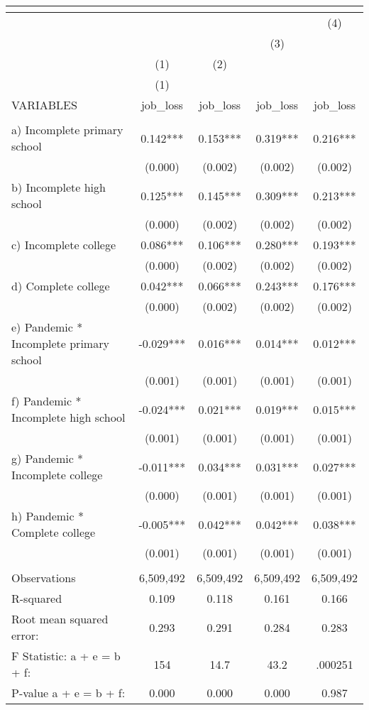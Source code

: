 \begin{tabular}{lcccc}
\multicolumn{5}{c}{} \\ \hline
 &  &  &  & (4) \\
 &  &  & (3) &  \\
 & (1) & (2) &  &  \\
 & (1) &  &  &  \\
VARIABLES & job\_loss & job\_loss & job\_loss & job\_loss \\ \hline
 &  &  &  &  \\
a) Incomplete primary school & 0.142*** & 0.153*** & 0.319*** & 0.216*** \\
 & (0.000) & (0.002) & (0.002) & (0.002) \\
b) Incomplete high school & 0.125*** & 0.145*** & 0.309*** & 0.213*** \\
 & (0.000) & (0.002) & (0.002) & (0.002) \\
c) Incomplete college & 0.086*** & 0.106*** & 0.280*** & 0.193*** \\
 & (0.000) & (0.002) & (0.002) & (0.002) \\
d) Complete college & 0.042*** & 0.066*** & 0.243*** & 0.176*** \\
 & (0.000) & (0.002) & (0.002) & (0.002) \\
e) Pandemic * Incomplete primary school & -0.029*** & 0.016*** & 0.014*** & 0.012*** \\
 & (0.001) & (0.001) & (0.001) & (0.001) \\
f) Pandemic * Incomplete high school & -0.024*** & 0.021*** & 0.019*** & 0.015*** \\
 & (0.001) & (0.001) & (0.001) & (0.001) \\
g) Pandemic * Incomplete college & -0.011*** & 0.034*** & 0.031*** & 0.027*** \\
 & (0.000) & (0.001) & (0.001) & (0.001) \\
h) Pandemic * Complete college & -0.005*** & 0.042*** & 0.042*** & 0.038*** \\
 & (0.001) & (0.001) & (0.001) & (0.001) \\
 &  &  &  &  \\
Observations & 6,509,492 & 6,509,492 & 6,509,492 & 6,509,492 \\
R-squared & 0.109 & 0.118 & 0.161 & 0.166 \\
Root mean squared error: & 0.293 & 0.291 & 0.284 & 0.283 \\
F Statistic: a + e = b + f: & 154 & 14.7 & 43.2 & .000251 \\
\hspace{1mm} P-value a + e = b + f: & 0.000 & 0.000 & 0.000 & 0.987 \\

\end{tabular}
